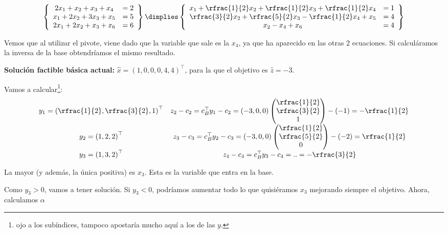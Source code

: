 \begin{example}
\[
\left\{
\begin{array}{cc}
2x_1+x_2+x_3 + x_4 &= 2   \\
x_1 + 2x_2 + 3x_3 +  x_5 &= 5  \\
2x_1+2x_2+x_3 + x_6 &= 6 
\end{array} 
\right\}
\dimplies
\left\{
\begin{array}{cc}
\displaystyle x_1+\rfrac{1}{2}x_2+\rfrac{1}{2}x_3 + \rfrac{1}{2}x_4 &= 1   \\
\displaystyle \rfrac{3}{2}x_2 + \rfrac{5}{2}x_3 - \rfrac{1}{2} x_4 + x_5 &= 4  \\
\displaystyle x_2 -x_4 + x_6 &= 4 
\end{array} 
\right\}
\]

Vemos que al utilizar el pivote, viene dado que la variable que sale es la $x_4$, ya que ha aparecido en las otras 2 ecuaciones. Si calculáramos la inversa de la base obtendríamos el mismo resultado.

\textbf{Solución factible básica actual:} $\hat{x}=(1,0,0,0,4,4)^\top$, para la que el objetivo es $\hat{z}=-3$.


Vamos a calcular\footnote{ojo a los subíndices, tampoco apostaría mucho aquí a los de las $y$.}:
\[
\begin{array}{cc}
	y_1 = \left(\rfrac{1}{2},\rfrac{3}{2},1\right)^\top 
& 
	z_2 - c_2 = c^\top_By_1 - c_2 = (-3,0,0)
		\begin{pmatrix}
			\rfrac{1}{2}\\\rfrac{3}{2}\\1
		\end{pmatrix} - (-1) = -\rfrac{1}{2}\\
	
	y_2 = \left(1,2,2\right)^\top 
& 
	z_3- c_3 = c^\top_By_2 - c_3 = (-3,0,0)
		\begin{pmatrix}
			\rfrac{1}{2}\\\rfrac{5}{2}\\0 
		\end{pmatrix} - (-2) = \rfrac{1}{2}\\
	
	y_3 = \left(1,3,2\right)^\top 
& 
	z_4 - c_4 = c^\top_By_3 - c_4 = .. = -\rfrac{3}{2}
\end{array}
\]

La mayor (y además, la única positiva) es $x_3$. Esta es la variable que entra en la base.

Como $y_3 > 0$, vamos a tener solución. Si $y_3 < 0$, podríamos aumentar todo lo que quisiéramos $x_3$ mejorando siempre el objetivo. Ahora, calculamos $α$


\end{example}
